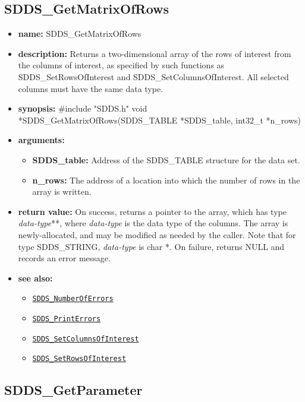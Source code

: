 \documentclass[11pt]{article}
\newcommand{\progref}[1]{\hyperref[SDDS_#1]{\tt SDDS\_#1}}
\begin{document}
\subsection{SDDS\_GetMatrixOfRows}
\label{SDDS_GetMatrixOfRows}

\begin{itemize}
\item {\bf name:}\newline
SDDS\_GetMatrixOfRows
\item {\bf description:}\newline
Returns a two-dimensional array of the rows of interest from the columns of interest, as specified by such functions as SDDS\_SetRowsOfInterest and SDDS\_SetColumnsOfInterest. All selected columns must have the same data type.
\item {\bf synopsis:} \#include "SDDS.h"\newline
void *SDDS\_GetMatrixOfRows(SDDS\_TABLE *SDDS\_table, int32\_t *n\_rows)
\item {\bf arguments:}
\begin{itemize}
\item {\bf SDDS\_table:} Address of the SDDS\_TABLE structure for the data set.
\item {\bf n\_rows:} The address of a location into which the number of rows in the array is written.
\end{itemize}
\item {\bf return value:}\newline
On success, returns a pointer to the array, which has type {\em data-type}**, where {\em data-type} is the data type of the columns. The array is newly-allocated, and may be modified as needed by the caller. Note that for type SDDS\_STRING, {\em data-type} is char *.\newline
\newline
On failure, returns NULL and records an error message.
\item {\bf see also:}
\begin{itemize}
\item \progref{NumberOfErrors}
\item \progref{PrintErrors}
\item \progref{SetColumnsOfInterest}
\item \progref{SetRowsOfInterest}
\end{itemize}
\end{itemize}

\subsection{SDDS\_GetParameter}
\label{SDDS_GetParameter}
\end{document}
